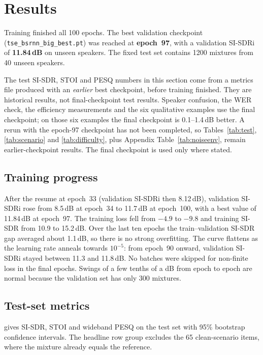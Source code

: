 \documentclass[11pt,a4paper]{article}
\newcommand{\sisdr}{SI-SDR}
\newcommand{\sisdri}{SI-SDRi}
\begin{document}
\section{Results}
\label{sec:results}

Training finished all 100 epochs. The best validation checkpoint
(\texttt{tse\_bsrnn\_big\_best.pt}) was reached at \textbf{epoch~97}, with a validation \sisdri{}
of \textbf{11.84\,dB} on unseen speakers. The fixed test set contains 1200 mixtures from 40 unseen
speakers.

The test \sisdr, STOI and PESQ numbers in this section come from a metrics file produced with an
\emph{earlier} best checkpoint, before training finished. They are historical results, not
final-checkpoint test results. Speaker confusion, the WER check, the efficiency measurements and
the six qualitative examples use the final checkpoint; on those six examples the final checkpoint
is 0.1--1.4\,dB better. A rerun with the epoch-97 checkpoint has not been completed, so
Tables~\ref{tab:test}, \ref{tab:scenario} and \ref{tab:difficulty}, plus Appendix
Table~\ref{tab:noiseenv}, remain earlier-checkpoint results. The final checkpoint is used only
where stated.

\subsection{Training progress}
After the resume at epoch~33 (validation \sisdri{} then 8.12\,dB), validation \sisdri{} rose from
8.5\,dB at epoch~34 to 11.7\,dB at epoch~100, with a best value of 11.84\,dB at epoch~97. The
training loss fell from $-4.9$ to $-9.8$ and training \sisdr{} from 10.9 to 15.2\,dB. Over the
last ten epochs the train--validation \sisdr{} gap averaged about 1.1\,dB, so there is no strong
overfitting. The curve flattens as the learning rate anneals towards $10^{-5}$: from epoch~90
onward, validation \sisdri{} stayed between 11.3 and 11.8\,dB. No batches were skipped for
non-finite loss in the final epochs. Swings of a few tenths of a dB from epoch to epoch are normal
because the validation set has only 300 mixtures.

\subsection{Test-set metrics}
\label{sec:testmetrics}
 gives \sisdr, STOI and wideband PESQ on the test set with 95\% bootstrap
confidence intervals. The headline row group excludes the 65 clean-scenario items, where the
mixture already equals the reference.
\end{document}
